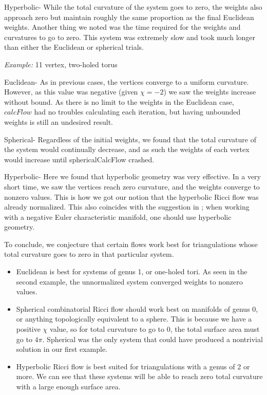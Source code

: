 \documentclass[12pt]{article}
\begin{document}
\noindent Hyperbolic- While the total curvature of the system goes to zero, the weights also approach zero but maintain roughly the same proportion as the final Euclidean weights. Another thing we noted was the time required for the weights and curvatures to go to zero. This system was extremely slow and took much longer than either the Euclidean or spherical trials. \newline

\noindent \textit{Example:} 11 vertex, two-holed torus\newline

\noindent Euclidean- As in previous cases, the vertices converge to a uniform curvature. However, as this value was negative (given $\chi = -2$) we saw the weights increase without bound. As there is no limit to the weights in the Euclidean case, $calcFlow$ had no troubles calculating each iteration, but having unbounded weights is still an undesired result. \newline

\noindent Spherical- Regardless of the initial weights, we found that the total curvature of the system would continually decrease, and as such the weights of each vertex would increase until sphericalCalcFlow crashed. \newline

\noindent Hyperbolic- Here we found that hyperbolic geometry was very effective. In a very short time, we saw the vertices reach zero curvature, and the weights converge to nonzero values. This is how we got our notion that the hyperbolic Ricci flow was already normalized. This also coincides with the suggestion in \cite{chowluo}; when working with a negative Euler characteristic manifold, one should use hyperbolic geometry.\newline

\noindent To conclude, we conjecture that certain flows work best for triangulations whose total curvature goes to zero in that particular system. 

\begin{itemize}
\item Euclidean is best for systems of genus 1, or one-holed tori. As seen in the second example, the unnormalized system converged weights to nonzero values. 
\item Spherical combinatorial Ricci flow should work best on manifolds of genus 0, or anything topologically equivalent to a sphere. This is because we have a positive $\chi$ value, so for total curvature to go to 0, the total surface area must go to $4\pi$. Spherical was the only system that could have produced a nontrivial solution in our first example. 
\item Hyperbolic Ricci flow is best suited for triangulations with a genus of 2 or more. We can see that these systems will be able to reach zero total curvature with a large enough surface area. 
\end{itemize}
\end{document}
